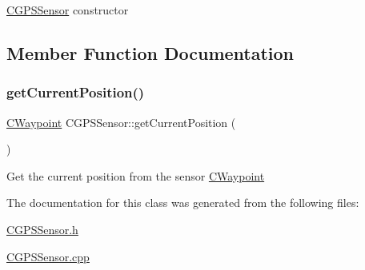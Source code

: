 \hyperlink{classCGPSSensor}{C\+G\+P\+S\+Sensor} constructor 

\subsection{Member Function Documentation}
\mbox{\label{classCGPSSensor_a6a3f3e3070e5f0c566712ea62b652684}} 
\subsubsection{\texorpdfstring{get\+Current\+Position()}{getCurrentPosition()}}
{\footnotesize\ttfamily \hyperlink{classCWaypoint}{C\+Waypoint} C\+G\+P\+S\+Sensor\+::get\+Current\+Position (\begin{DoxyParamCaption}{ }\end{DoxyParamCaption})}

Get the current position from the sensor  \hyperlink{classCWaypoint}{C\+Waypoint} 

The documentation for this class was generated from the following files\+:\begin{DoxyCompactItemize}
\item 
\hyperlink{CGPSSensor_8h}{C\+G\+P\+S\+Sensor.\+h}\item 
\hyperlink{CGPSSensor_8cpp}{C\+G\+P\+S\+Sensor.\+cpp}\end{DoxyCompactItemize}
